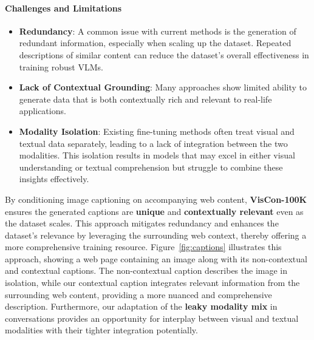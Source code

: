 \paragraph{\textbf{Challenges and Limitations}}

\begin{itemize}
    \item \textbf{Redundancy}: A common issue with current methods is the generation of redundant information, especially when scaling up the dataset. Repeated descriptions of similar content can reduce the dataset's overall effectiveness in training robust VLMs.
    \item \textbf{Lack of Contextual Grounding}: Many approaches show limited ability to generate data that is both contextually rich and relevant to real-life applications.
    \item \textbf{Modality Isolation}: Existing fine-tuning methods often treat visual and textual data separately, leading to a lack of integration between the two modalities. This isolation results in models that may excel in either visual understanding or textual comprehension but struggle to combine these insights effectively.
\end{itemize}




By conditioning image captioning on accompanying web content, \textbf{VisCon-100K} ensures the generated captions are \textbf{unique} and \textbf{contextually relevant} even as the dataset scales. This approach mitigates redundancy and enhances the dataset's relevance by leveraging the surrounding web context, thereby offering a more comprehensive training resource.
Figure~\ref{fig:captions} illustrates this approach, showing a web page containing an image along with its non-contextual and contextual captions. The non-contextual caption describes the image in isolation, while our contextual caption integrates relevant information from the surrounding web content, providing a more nuanced and comprehensive description. Furthermore, our adaptation of the \textbf{leaky modality mix} in conversations provides an opportunity for interplay between visual and textual modalities with their tighter integration potentially.

